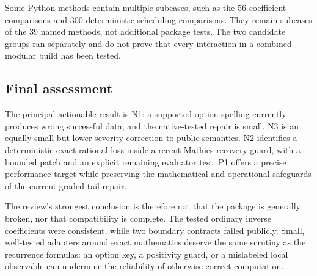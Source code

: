 \documentclass[11pt,letterpaper]{article}
\begin{document}
Some Python methods contain multiple subcases, such as the 56 coefficient comparisons and 300 deterministic scheduling comparisons. They remain subcases of the 39 named methods, not additional package tests. The two candidate groups ran separately and do not prove that every interaction in a combined modular build has been tested.

\subsection{Final assessment}
The principal actionable result is N1: a supported option spelling currently produces wrong successful data, and the native-tested repair is small. N3 is an equally small but lower-severity correction to public semantics. N2 identifies a deterministic exact-rational loss inside a recent Mathics recovery guard, with a bounded patch and an explicit remaining evaluator test. P1 offers a precise performance target while preserving the mathematical and operational safeguards of the current graded-tail repair.

The review's strongest conclusion is therefore not that the package is generally broken, nor that compatibility is complete. The tested ordinary inverse coefficients were consistent, while two boundary contracts failed publicly. Small, well-tested adapters around exact mathematics deserve the same scrutiny as the recurrence formulas: an option key, a positivity guard, or a mislabeled local observable can undermine the reliability of otherwise correct computation.

\appendix
\end{document}
